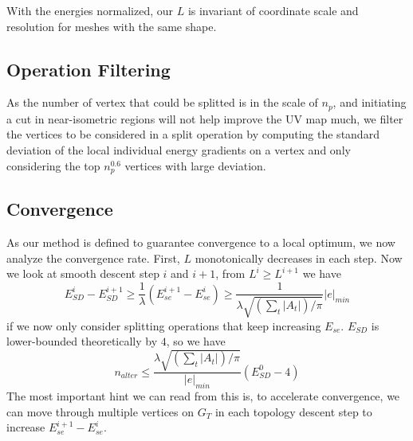 With the energies normalized, our $L$ is invariant of coordinate scale and resolution for meshes with the same shape.





\subsection{Operation Filtering}
\label{sec:operationFiltering}
As the number of vertex that could be splitted is in the scale of $n_p$, and initiating a cut in near-isometric regions will not help improve the UV map much, we filter the vertices to be considered in a split operation by computing the standard deviation of the local individual energy gradients on a vertex and only considering the top $n_p^{0.6}$ vertices with large deviation. 

\subsection{Convergence}
\label{sec:convergence}


As our method is defined to guarantee convergence to a local optimum, we now analyze the convergence rate. First, $L$ monotonically decreases in each step. Now we look at smooth descent step $i$ and $i+1$, from $L^i \geq L^{i+1}$ we have
\[ E^i_{SD} - E^{i+1}_{SD} \geq \frac{1}{\lambda} (E^{i+1}_{se} - E^i_{se}) \geq \frac{1}{\lambda\sqrt{(\sum_t |A_t|)/\pi}} |e|_{min} \]
if we now only consider splitting operations that keep increasing $E_{se}$. $E_{SD}$ is lower-bounded theoretically by $4$, so we have
\[ n_{alter} \leq \frac{\lambda\sqrt{(\sum_t |A_t|)/\pi}}{|e|_{min}} (E^0_{SD} - 4) \]
The most important hint we can read from this is, to accelerate convergence, we can move through multiple vertices on $G_T$ in each topology descent step to increase $E^{i+1}_{se} - E^i_{se}$.

 